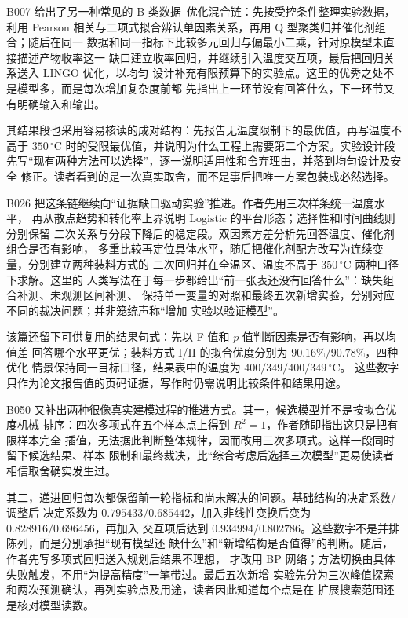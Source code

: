 \documentclass[UTF8,a4paper,12pt]{ctexart}
\begin{document}
B007 给出了另一种常见的 B 类数据--优化混合链：先按受控条件整理实验数据，利用
Pearson 相关与二项式拟合辨认单因素关系，再用 Q 型聚类归并催化剂组合；随后在同一
数据和同一指标下比较多元回归与偏最小二乘，针对原模型未直接描述产物收率这一
缺口建立收率回归，并继续引入温度交互项，最后把回归关系送入 LINGO 优化，以均匀
设计补充有限预算下的实验点。这里的优秀之处不是模型多，而是每次增加复杂度前都
先指出上一环节没有回答什么，下一环节又有明确输入和输出。

其结果段也采用容易核读的成对结构：先报告无温度限制下的最优值，再写温度不高于
$350\,^{\circ}\mathrm{C}$ 时的受限最优值，并说明为什么工程上需要第二个方案。实验设计段
先写“现有两种方法可以选择”，逐一说明适用性和舍弃理由，并落到均匀设计及安全
修正。读者看到的是一次真实取舍，而不是事后把唯一方案包装成必然选择。

B026 把这条链继续向“证据缺口驱动实验”推进。作者先用三次样条统一温度水平，
再从散点趋势和转化率上界说明 Logistic 的平台形态；选择性和时间曲线则分别保留
二次关系与分段下降后的稳定段。双因素方差分析先回答温度、催化剂组合是否有影响，
多重比较再定位具体水平，随后把催化剂配方改写为连续变量，分别建立两种装料方式的
二次回归并在全温区、温度不高于 $350\,^{\circ}\mathrm{C}$ 两种口径下求解。这里的
人类写法在于每一步都给出“前一张表还没有回答什么”：缺失组合补测、未观测区间补测、
保持单一变量的对照和最终五次新增实验，分别对应不同的裁决问题；并非笼统声称“增加
实验以验证模型”。

该篇还留下可供复用的结果句式：先以 F 值和 $p$ 值判断因素是否有影响，再以均值差
回答哪个水平更优；装料方式 I/II 的拟合优度分别为 $90.16\%/90.78\%$，四种优化
情景保持同一目标口径，结果表中的温度为 $400/349/400/349\,^{\circ}\mathrm{C}$。
这些数字只作为论文报告值的页码证据，写作时仍需说明比较条件和结果用途。

B050 又补出两种很像真实建模过程的推进方式。其一，候选模型并不是按拟合优度机械
排序：四次多项式在五个样本点上得到 $R^2=1$，作者随即指出这只是把有限样本完全
插值，无法据此判断整体规律，因而改用三次多项式。这样一段同时留下候选结果、样本
限制和最终裁决，比“综合考虑后选择三次模型”更易使读者相信取舍确实发生过。

其二，递进回归每次都保留前一轮指标和尚未解决的问题。基础结构的决定系数/调整后
决定系数为 $0.795433/0.685442$，加入非线性变换后变为 $0.828916/0.696456$，再加入
交互项后达到 $0.934994/0.802786$。这些数字不是并排陈列，而是分别承担“现有模型还
缺什么”和“新增结构是否值得”的判断。随后，作者先写多项式回归送入规划后结果不理想，
才改用 BP 网络；方法切换由具体失败触发，不用“为提高精度”一笔带过。最后五次新增
实验先分为三次峰值探索和两次预测确认，再列实验点及用途，读者因此知道每个点是在
扩展搜索范围还是核对模型读数。
\end{document}

